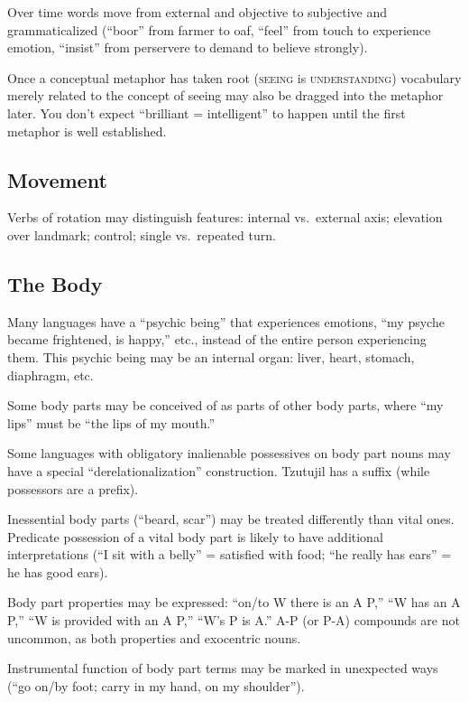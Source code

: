 \documentclass[11pt]{article}
\newcommand{\I}[1]{\textsc{#1}}   %
\begin{document}
{Over time words move from external and objective to subjective and
grammaticalized (``boor'' from farmer to oaf, ``feel'' from touch to
experience emotion, ``insist'' from perservere to demand to believe
strongly).

Once a conceptual metaphor has taken root (\I{seeing} is
\I{understanding}) vocabulary merely related to the concept of seeing
may also be dragged into the metaphor later.  You don't expect
``brilliant = intelligent'' to happen until the first metaphor is well
established.

\subsection{Movement}
Verbs of rotation may distinguish features: internal vs.\ external
axis; elevation over landmark; control; single vs.\ repeated turn.


\subsection{The Body}
Many languages have a ``psychic being'' that experiences emotions,
``my psyche became frightened, is happy,'' etc., instead of the entire
person experiencing them.  This psychic being may be an internal
organ: liver, heart, stomach, diaphragm, etc.

Some body parts may be conceived of as parts of other body parts,
where ``my lips'' must be ``the lips of my mouth.''

Some languages with obligatory inalienable possessives on body part
nouns may have a special ``derelationalization'' construction.
Tzutujil has a suffix (while possessors are a prefix).

Inessential body parts (``beard, scar'') may be treated differently
than vital ones.  Predicate possession of a vital body part is likely
to have additional interpretations (``I sit with a belly'' = satisfied
with food; ``he really has ears'' = he has good ears).

Body part properties may be expressed: ``on/to W there is an A P,''
``W has an A P,'' ``W is provided with an A P,'' ``W's P is A.''  A-P
(or P-A) compounds are not uncommon, as both properties and exocentric
nouns. 

Instrumental function of body part terms may be marked in unexpected
ways (``go on/by foot; carry in my hand, on my shoulder'').

}
\end{document}
